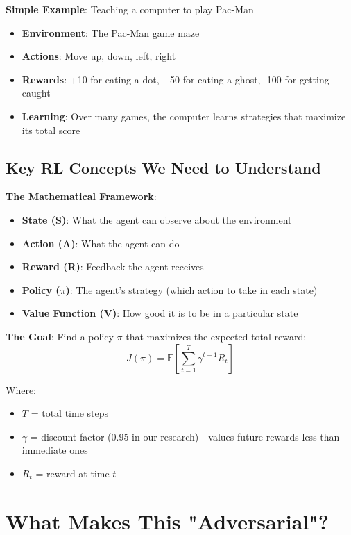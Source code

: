 \documentclass[11pt]{article}
\begin{document}
\begin{example}
\textbf{Simple Example}: Teaching a computer to play Pac-Man
\begin{itemize}
\item \textbf{Environment}: The Pac-Man game maze
\item \textbf{Actions}: Move up, down, left, right
\item \textbf{Rewards}: +10 for eating a dot, +50 for eating a ghost, -100 for getting caught
\item \textbf{Learning}: Over many games, the computer learns strategies that maximize its total score
\end{itemize}
\end{example}

\subsection{Key RL Concepts We Need to Understand}

\begin{mathdetails}
\textbf{The Mathematical Framework}:
\begin{itemize}
\item \textbf{State (S)}: What the agent can observe about the environment
\item \textbf{Action (A)}: What the agent can do
\item \textbf{Reward (R)}: Feedback the agent receives
\item \textbf{Policy ($\pi$)}: The agent's strategy (which action to take in each state)
\item \textbf{Value Function (V)}: How good it is to be in a particular state
\end{itemize}

\textbf{The Goal}: Find a policy $\pi$ that maximizes the expected total reward:
$$J(\pi) = \mathbb{E}\left[\sum_{t=1}^{T} \gamma^{t-1} R_t\right]$$

Where:
\begin{itemize}
\item $T$ = total time steps
\item $\gamma$ = discount factor (0.95 in our research) - values future rewards less than immediate ones
\item $R_t$ = reward at time $t$
\end{itemize}
\end{mathdetails}

\section{What Makes This "Adversarial"?}
\end{document}
